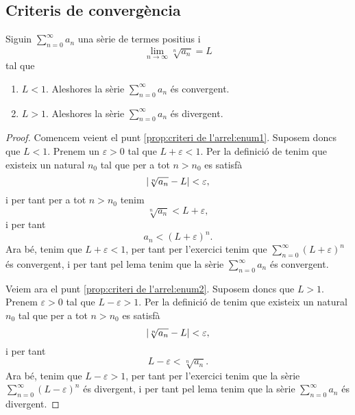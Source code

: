 \documentclass[../Apunts.tex]{subfiles}
\begin{document}
	\subsection{Criteris de convergència}
	\begin{proposition}
		\label{prop:criteri de l'arrel}
		Siguin \(\sum_{n=0}^{\infty}a_{n}\) una sèrie de termes positius i
		\[\lim_{n\to\infty}\sqrt[n]{a_{n}}=L\]
		tal que
		\begin{enumerate}
			\item\label{prop:criteri de l'arrel:enum1} \(L<1\). Aleshores la sèrie \(\sum_{n=0}^{\infty}a_{n}\) és convergent.
			\item\label{prop:criteri de l'arrel:enum2} \(L>1\). Aleshores la sèrie \(\sum_{n=0}^{\infty}a_{n}\) és divergent.
		\end{enumerate}
		\begin{proof}
			Comencem veient el punt \eqref{prop:criteri de l'arrel:enum1}.  Suposem doncs que \(L<1\). Prenem un \(\varepsilon>0\) tal que \(L+\varepsilon<1\). Per la definició de  tenim que existeix un natural \(n_{0}\) tal que per a tot \(n>n_{0}\) es satisfà
			\[\abs{\sqrt[n]{a_{n}}-L}<\varepsilon,\]
			i per tant per a tot \(n>n_{0}\) tenim
			\[\sqrt[n]{a_{n}}<L+\varepsilon,\]
			i per tant
			\[a_{n}<\left(L+\varepsilon\right)^{n}.\]
			Ara bé, tenim que \(L+\varepsilon<1\), per tant per l'exercici  tenim que \(\sum_{n=0}^{\infty}(L+\varepsilon)^{n}\) és convergent, i per tant pel lema  tenim que la sèrie \(\sum_{n=0}^{\infty}a_{n}\) és convergent.
			
			Veiem ara el punt \eqref{prop:criteri de l'arrel:enum2}. Suposem doncs que \(L>1\). Prenem \(\varepsilon>0\) tal que \(L-\varepsilon>1\). Per la definició de  tenim que existeix un natural \(n_{0}\) tal que per a tot \(n>n_{0}\) es satisfà
			\[\abs{\sqrt[n]{a_{n}}-L}<\varepsilon,\]
			i per tant
			\[L-\varepsilon<\sqrt[n]{a_{n}}.\]
			Ara bé, tenim que \(L-\varepsilon>1\), per tant per l'exercici  tenim que la sèrie \(\sum_{n=0}^{\infty}(L-\varepsilon)^{n}\) és divergent, i per tant pel lema  tenim que la sèrie \(\sum_{n=0}^{\infty}a_{n}\) és divergent.
		\end{proof}
	\end{proposition}
\end{document}
